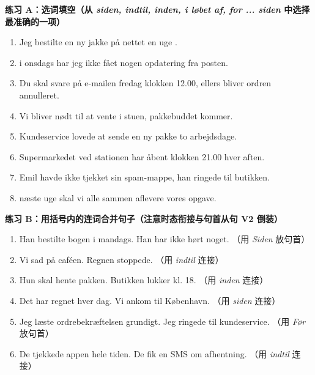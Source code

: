 \textbf{练习 A：选词填空（从 \textit{siden, indtil, inden, i løbet af, for ... siden} 中选择最准确的一项）}
\begin{enumerate}
  \item Jeg bestilte en ny jakke på nettet \underline{\hspace{2.2cm}} en uge \underline{\hspace{1.4cm}}.
  \item \underline{\hspace{2.0cm}} i onsdags har jeg ikke fået nogen opdatering fra posten.
  \item Du skal svare på e-mailen \underline{\hspace{2.0cm}} fredag klokken 12.00, ellers bliver ordren annulleret.
  \item Vi bliver nødt til at vente i stuen, \underline{\hspace{2.0cm}} pakkebuddet kommer.
  \item Kundeservice lovede at sende en ny pakke \underline{\hspace{2.4cm}} to arbejdsdage.
  \item Supermarkedet ved stationen har åbent \underline{\hspace{2.0cm}} klokken 21.00 hver aften.
  \item Emil havde ikke tjekket sin spam-mappe, \underline{\hspace{2.0cm}} han ringede til butikken.
  \item \underline{\hspace{2.0cm}} næste uge skal vi alle sammen aflevere vores opgave.
\end{enumerate}

\textbf{练习 B：用括号内的连词合并句子（注意时态衔接与句首从句 V2 倒装）}
\begin{enumerate}
  \item Han bestilte bogen i mandags. Han har ikke hørt noget. （用 \textit{Siden} 放句首）
  \item Vi sad på caféen. Regnen stoppede. （用 \textit{indtil} 连接）
  \item Hun skal hente pakken. Butikken lukker kl. 18. （用 \textit{inden} 连接）
  \item Det har regnet hver dag. Vi ankom til København. （用 \textit{siden} 连接）
  \item Jeg læste ordrebekræftelsen grundigt. Jeg ringede til kundeservice. （用 \textit{Før} 放句首）
  \item De tjekkede appen hele tiden. De fik en SMS om afhentning. （用 \textit{indtil} 连接）
\end{enumerate}

